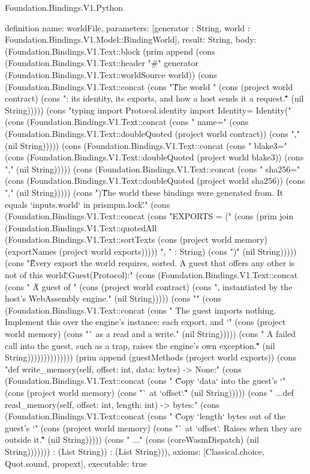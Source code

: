 \begin{lexlean}{Foundation.Bindings.V1.Python}
\begin{semanticmodule}
definition{
  name: worldFile,
  parameters: [generator : String, world : Foundation.Bindings.V1.Model::BindingWorld],
  result: String,
  body: (Foundation.Bindings.V1.Text::block (prim append (cons (Foundation.Bindings.V1.Text::header "#" generator (Foundation.Bindings.V1.Text::worldSource world)) (cons (Foundation.Bindings.V1.Text::concat (cons "\"\"\"The world " (cons (project world contract) (cons ": its identity, its exports, and how a host sends it a request.\"\"\"" (nil String))))) (cons "\nfrom typing import Protocol\n\nfrom .identity import Identity\n\nWORLD = Identity(" (cons (Foundation.Bindings.V1.Text::concat (cons "    name=" (cons (Foundation.Bindings.V1.Text::doubleQuoted (project world contract)) (cons "," (nil String))))) (cons (Foundation.Bindings.V1.Text::concat (cons "    blake3=" (cons (Foundation.Bindings.V1.Text::doubleQuoted (project world blake3)) (cons "," (nil String))))) (cons (Foundation.Bindings.V1.Text::concat (cons "    sha256=" (cons (Foundation.Bindings.V1.Text::doubleQuoted (project world sha256)) (cons "," (nil String))))) (cons ")\n\"\"\"The world these bindings were generated from. It equals `inputs.world` in prismpm.lock.\"\"\"\n" (cons (Foundation.Bindings.V1.Text::concat (cons "EXPORTS = (" (cons (prim join (Foundation.Bindings.V1.Text::quotedAll (Foundation.Bindings.V1.Text::sortTexts (cons (project world memory) (exportNames (project world exports))))) ", " : String) (cons ")" (nil String))))) (cons "\"\"\"Every export the world requires, sorted. A guest that offers any other is not of this world.\"\"\"\n\n\nclass Guest(Protocol):" (cons (Foundation.Bindings.V1.Text::concat (cons "    \"\"\"A guest of " (cons (project world contract) (cons ", instantiated by the host's WebAssembly engine." (nil String))))) (cons "" (cons (Foundation.Bindings.V1.Text::concat (cons "    The guest imports nothing. Implement this over the engine's instance: each export, and `" (cons (project world memory) (cons "` as a read and a write." (nil String))))) (cons "    A failed call into the guest, such as a trap, raises the engine's own exception.\n    \"\"\"" (nil String)))))))))))))) (prim append (guestMethods (project world exports)) (cons "\n    def write_memory(self, offset: int, data: bytes) -> None:" (cons (Foundation.Bindings.V1.Text::concat (cons "        \"\"\"Copy `data` into the guest's `" (cons (project world memory) (cons "` at `offset`.\"\"\"" (nil String))))) (cons "        ...\n\n    def read_memory(self, offset: int, length: int) -> bytes:" (cons (Foundation.Bindings.V1.Text::concat (cons "        \"\"\"Copy `length` bytes out of the guest's `" (cons (project world memory) (cons "` at `offset`. Raises when they are outside it.\"\"\"" (nil String))))) (cons "        ...\n\n" (cons (coreWasmDispatch) (nil String))))))) : (List String)) : (List String))),
  axioms: [Classical.choice, Quot.sound, propext],
  executable: true
}


\end{semanticmodule}
\end{lexlean}
